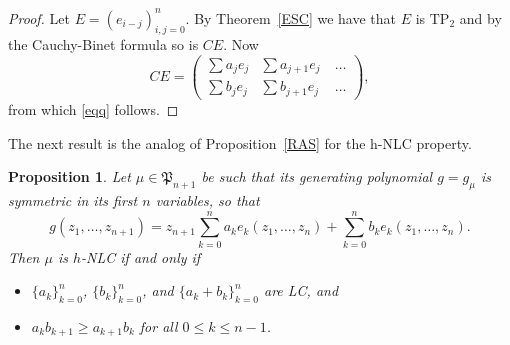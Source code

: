 \documentclass[10pt,reqno]{amsart}
\theoremstyle{plain}
\newtheorem{proposition}[theorem]{Proposition}
\theoremstyle{definition}
\theoremstyle{remark}
\newcommand{\TP}{\text{TP}}
\newcommand{\fP}{\mathfrak{P}}
\begin{document}
\begin{proof}
Let $E=(e_{i-j})_{i,j=0}^{n}$. By Theorem~\ref{ESC} we have that $E$ is 
$\TP_2$ and by the Cauchy-Binet formula so is $CE$.  Now 
 $$CE=\left( \begin{array}{ccc}
  \sum a_je_j  & \sum a_{j+1}e_j\ & \ldots  \\
  \sum b_je_j & \sum b_{j+1}e_j & \ldots 
\end{array} \right),$$
from which \eqref{eqq} follows. 
\end{proof}

The next result is the analog of Proposition~\ref{RAS} for the h-NLC property.

\begin{proposition}\label{pro-h-NLC}
Let $\mu\in \fP_{n+1}$ be such that its  generating polynomial $g=g_{\mu}$
is symmetric in its first $n$ variables, so that
$$g(z_1,\ldots,z_{n+1})
=z_{n+1}\sum_{k=0}^n a_ke_k(z_1,\ldots,z_n)+
\sum_{k=0}^n b_ke_k(z_1,\ldots,z_n).$$
Then $\mu$ is $h$-NLC if and only if
\begin{itemize}
\item[(i)] $\{a_k\}_{k=0}^n$, $\{b_k\}_{k=0}^n$, and 
$\{a_k+b_k\}_{k=0}^n$ are LC, and
\item[(ii)] $a_kb_{k+1}\geq a_{k+1}b_k$ for all $0\leq k\leq n-1$. 
\end{itemize}
\end{proposition}
\end{document}
